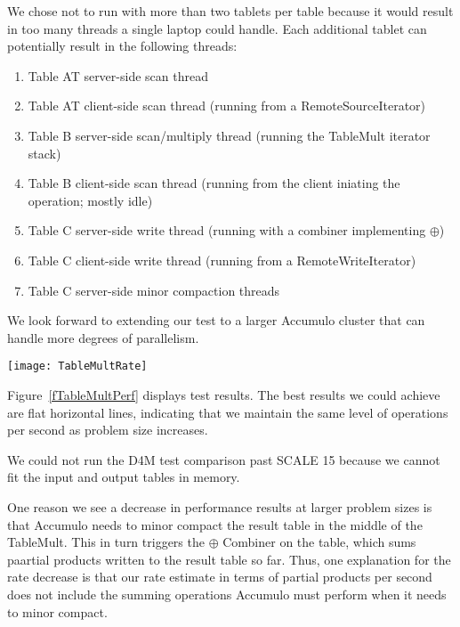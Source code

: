 We chose not to run with more than two tablets per table because it would result in too many threads 
a single laptop could handle.  Each additional tablet can potentially result in the following threads:
\begin{enumerate}
\item Table AT server-side scan thread
\item Table AT client-side scan thread (running from a RemoteSourceIterator)
\item Table B server-side scan/multiply thread (running the TableMult iterator stack)
\item Table B client-side scan thread (running from the client iniating the operation; mostly idle)
\item Table C server-side write thread (running with a combiner implementing $\oplus$)
\item Table C client-side write thread (running from a RemoteWriteIterator)
\item Table C server-side minor compaction threads
\end{enumerate}
We look forward to extending our test to a larger Accumulo cluster that can handle more degrees of parallelism.

\begin{figure*}[h]
\centering
\texttt{[image: TableMultRate]}
\caption{Data flow through the TableMult iterator stack}
\label{fTableMultPerf}
\end{figure*}

Figure~\ref{fTableMultPerf} displays test results.
The best results we could achieve are flat horizontal lines, indicating that we maintain the same level of
operations per second as problem size increases.

We could not run the D4M test comparison past SCALE 15 because we cannot fit the input and output tables
in memory.

One reason we see a decrease in performance results at larger problem sizes is that Accumulo
needs to minor compact the result table in the middle of the TableMult. This in turn triggers 
the $\oplus$ Combiner on the table, which sums paartial products written to the result table so far.
Thus, one explanation for the rate decrease is that 
our rate estimate in terms of partial products per second does not include the summing operations
Accumulo must perform when it needs to minor compact.

